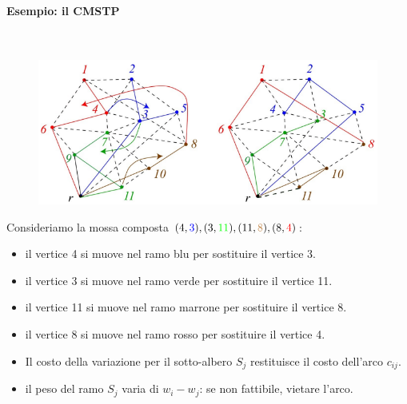 \documentclass{article}
\begin{document}
\paragraph{Esempio: il CMSTP}\mbox{}\\
\begin{figure}[H]
    \centering
    \includegraphics[scale=0.6]{images/miglioramento_grafo.png}
\end{figure}
Consideriamo la mossa composta $(4,\begingroup\color{blue}3\endgroup),(3,\begingroup\color{green}11\endgroup),(11,\begingroup\color{brown}8\endgroup),(8,\begingroup\color{red}4\endgroup)$:
\begin{itemize}
    \item il vertice 4 si muove nel ramo blu per sostituire il vertice 3.
    \item il vertice 3 si muove nel ramo verde per sostituire il vertice 11.
    \item il vertice 11 si muove nel ramo marrone per sostituire il vertice 8.
    \item il vertice 8 si muove nel ramo rosso per sostituire il vertice 4.
\end{itemize}
\begin{itemize}
\item Il costo della variazione per il sotto-albero $S_j$ restituisce il costo dell'arco $c_{ij}$.
\item il peso del ramo $S_j$ varia di $w_i-w_j$: se non fattibile, vietare l'arco.
\end{itemize}
\end{document}
